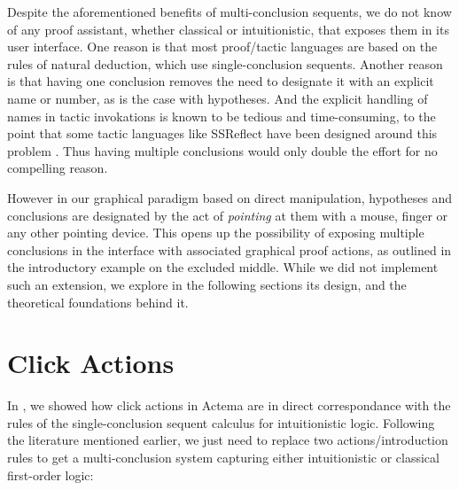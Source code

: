 Despite the aforementioned benefits of multi-conclusion sequents, we do not know
of any proof assistant, whether classical or intuitionistic, that exposes them
in its user interface. One reason is that most proof/tactic languages are based
on the rules of natural deduction, which use single-conclusion sequents. Another
reason is that having one conclusion removes the need to designate it with an
explicit name or number, as is the case with hypotheses. And the explicit handling
of names in tactic invokations is known to be tedious and time-consuming, to the
point that some tactic languages like SSReflect have been designed around this
problem . Thus having multiple conclusions would only double the
effort for no compelling reason.

However in our graphical paradigm based on direct manipulation, hypotheses and
conclusions are designated by the act of \emph{pointing} at them with a mouse,
finger or any other pointing device. This opens up the possibility of exposing
multiple conclusions in the interface with associated graphical proof actions,
as outlined in the introductory example on the excluded middle. While we did not
implement such an extension, we explore in the following sections its design,
and the theoretical foundations behind it.

\section{Click Actions}

In , we showed how click actions in Actema are in direct
correspondance with the rules of the single-conclusion sequent calculus 
for intuitionistic logic. Following the literature mentioned earlier, we just
need to replace two actions/introduction rules to get a multi-conclusion system
capturing either intuitionistic or classical first-order logic:

